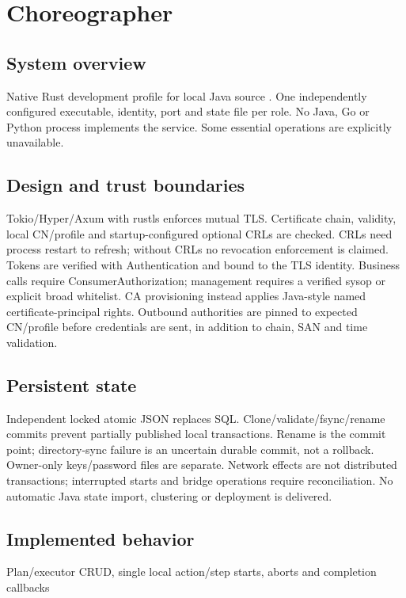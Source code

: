 \documentclass[a4paper]{arrowhead}
\begin{document}
\ArrowheadSetup
\section{Choreographer}
\subsection{System overview}
Native Rust development profile for local Java source . One independently configured executable, identity, port and state file per role. No Java, Go or Python process implements the service. Some essential operations are explicitly unavailable.
\subsection{Design and trust boundaries}
Tokio/Hyper/Axum with rustls enforces mutual TLS. Certificate chain, validity, local CN/profile and startup-configured optional CRLs are checked. CRLs need process restart to refresh; without CRLs no revocation enforcement is claimed. Tokens are verified with Authentication and bound to the TLS identity. Business calls require ConsumerAuthorization; management requires a verified sysop or explicit broad whitelist. CA provisioning instead applies Java-style named certificate-principal rights. Outbound authorities are pinned to expected CN/profile before credentials are sent, in addition to chain, SAN and time validation.
\subsection{Persistent state}
Independent locked atomic JSON replaces SQL. Clone/validate/fsync/rename commits prevent partially published local transactions. Rename is the commit point; directory-sync failure is an uncertain durable commit, not a rollback. Owner-only keys/password files are separate. Network effects are not distributed transactions; interrupted starts and bridge operations require reconciliation. No automatic Java state import, clustering or deployment is delivered.
\subsection{Implemented behavior}
Plan/executor CRUD, single local action/step starts, aborts and completion callbacks
\end{document}

